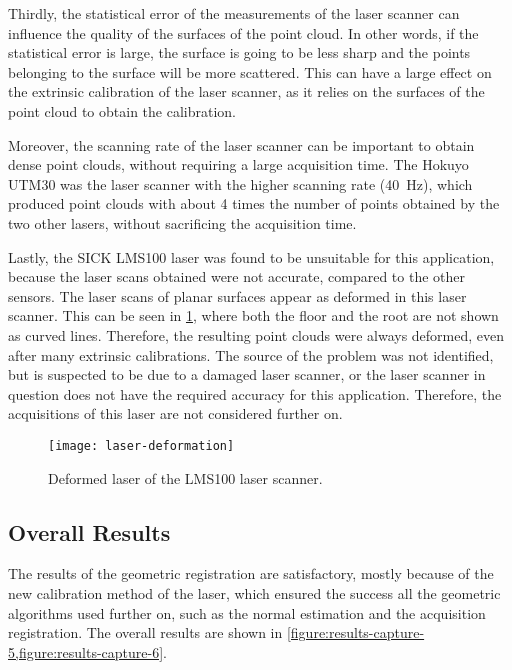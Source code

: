 Thirdly, the statistical error of the measurements of the laser scanner can influence the quality of the surfaces of the point cloud. In other words, if the statistical error is large, the surface is going to be less sharp and the points belonging to the surface will be more scattered. This can have a large effect on the extrinsic calibration of the laser scanner, as it relies on the surfaces of the point cloud to obtain the calibration.

Moreover, the scanning rate of the laser scanner can be important to obtain dense point clouds, without requiring a large acquisition time. The Hokuyo UTM30 was the laser scanner with the higher scanning rate (\SI{40}{\hertz}), which produced point clouds with about 4 times the number of points obtained by the two other lasers, without sacrificing the acquisition time.

Lastly, the SICK LMS100 laser was found to be unsuitable for this application, because the laser scans obtained were not accurate, compared to the other sensors. The laser scans of planar surfaces appear as deformed in this laser scanner. This can be seen in \cref{figure:deformed-laser}, where both the floor and the root are not shown as curved lines. Therefore, the resulting point clouds were always deformed, even after many extrinsic calibrations. The source of the problem was not identified, but is suspected to be due to a damaged laser scanner, or the laser scanner in question does not have the required accuracy for this application. Therefore, the acquisitions of this laser are not considered further on.

\begin{figure}[h]
    
    \centering
    \texttt{[image: laser-deformation]}

    \caption{Deformed laser of the LMS100 laser scanner.}
    \label{figure:deformed-laser}

\end{figure}

\subsection{Overall Results}

The results of the geometric registration are satisfactory, mostly because of the new calibration method of the laser, which ensured the success all the geometric algorithms used further on, such as the normal estimation and the acquisition registration. The overall results are shown in \cref{figure:results-capture-5,figure:results-capture-6}.


